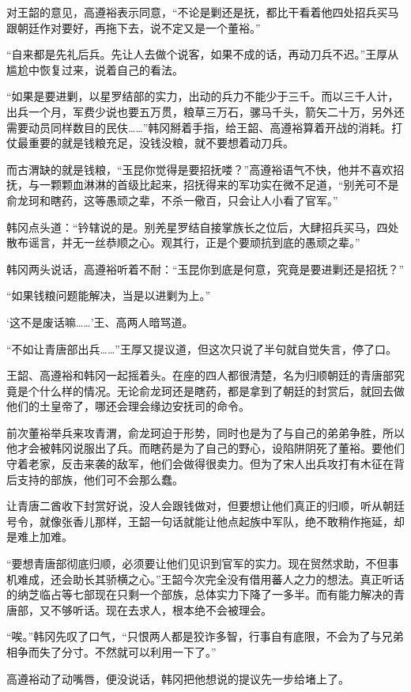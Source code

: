 对王韶的意见，高遵裕表示同意，“不论是剿还是抚，都比干看着他四处招兵买马跟朝廷作对要好，再拖下去，说不定又是一个董裕。”

“自来都是先礼后兵。先让人去做个说客，如果不成的话，再动刀兵不迟。”王厚从尴尬中恢复过来，说着自己的看法。

“如果是要进剿，以星罗结部的实力，出动的兵力不能少于三千。而以三千人计，出兵一个月，军费少说也要五万贯，粮草三万石，骡马千头，箭矢二十万，另外还需要动员同样数目的民伕……”韩冈掰着手指，给王韶、高遵裕算着开战的消耗。打仗最重要的就是钱粮充足，没钱没粮，就不要想着动刀兵。

而古渭缺的就是钱粮，“玉昆你觉得是要招抚喽？”高遵裕语气不快，他并不喜欢招抚，与一颗颗血淋淋的首级比起来，招抚得来的军功实在微不足道，“别羌可不是俞龙珂和瞎药，这等愚顽之辈，不杀一儆百，只会让人小看了官军。”

韩冈点头道：“钤辖说的是。别羌星罗结自接掌族长之位后，大肆招兵买马，四处散布谣言，并无一丝恭顺之心。观其行，正是个要顽抗到底的愚顽之辈。”

韩冈两头说话，高遵裕听着不耐：“玉昆你到底是何意，究竟是要进剿还是招抚？”

“如果钱粮问题能解决，当是以进剿为上。”

‘这不是废话嘛……’王、高两人暗骂道。

“不如让青唐部出兵……”王厚又提议道，但这次只说了半句就自觉失言，停了口。

王韶、高遵裕和韩冈一起摇着头。在座的四人都很清楚，名为归顺朝廷的青唐部究竟是个什么样的情况。无论俞龙珂还是瞎药，都是拿到了朝廷的封赏后，就回去做他们的土皇帝了，哪还会理会缘边安抚司的命令。

前次董裕举兵来攻青渭，俞龙珂迫于形势，同时也是为了与自己的弟弟争胜，所以他才会被韩冈说服出了兵。而瞎药是为了自己的野心，设陷阱阴死了董裕。要他们守着老家，反击来袭的敌军，他们会做得很卖力。但为了宋人出兵攻打有木征在背后支持的部族，他们可不会那么蠢。

让青唐二酋收下封赏好说，没人会跟钱做对，但要想让他们真正的归顺，听从朝廷号令，就像张香儿那样，王韶一句话就能让他点起族中军队，绝不敢稍作拖延，却是难上加难。

“要想青唐部彻底归顺，必须要让他们见识到官军的实力。现在贸然求助，不但事机难成，还会助长其骄横之心。”王韶今次完全没有借用蕃人之力的想法。真正听话的纳芝临占等七部现在只剩一个部族，总体实力下降了一多半。而有能力解决的青唐部，又不够听话。现在去求人，根本绝不会被理会。

“唉。”韩冈先叹了口气，“只恨两人都是狡诈多智，行事自有底限，不会为了与兄弟相争而失了分寸。不然就可以利用一下了。”

高遵裕动了动嘴唇，便没说话，韩冈把他想说的提议先一步给堵上了。

